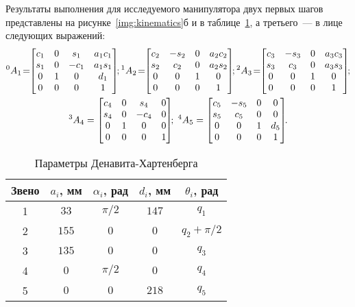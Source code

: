 Результаты выполнения для исследуемого манипулятора двух первых шагов представлены на рисунке~\ref{img:kinematics}б и в таблице~\ref{table_DH_params}, а третьего~--- в лице следующих выражений:
\begin{gather}
	{}^0A_1\! =\!\!
    \left[\begin{matrix}c_1 & 0 & s_1 & a_{1} c_1\\s_1 & 0 & - c_1 & a_{1} s_1\\0 & 1 & 0 & d_{1}\\0 & 0 & 0 & 1\end{matrix}\right]\!\!;
	{}^1A_2\! =\!\!
	\left[\begin{matrix}c_2 & - s_2 & 0 & a_{2} c_2\\s_2 & c_2 & 0 & a_{2} s_2\\0 & 0 & 1 & 0\\0 & 0 & 0 & 1\end{matrix}\right]\!\!;
	{}^2A_3\! =\!\!
	\left[\begin{matrix}c_3 & - s_3 & 0 & a_{3} c_3\\s_3 & c_3 & 0 & a_{3} s_3\\0 & 0 & 1 & 0\\0 & 0 & 0 & 1\end{matrix}\right]\!\!;\notag
	\\
	{}^3A_4 =
	 \left[\begin{matrix}c_4 & 0 & s_4 & 0\\s_4 & 0 & - c_4 & 0\\0 & 1 & 0 & 0\\0 & 0 & 0 & 1\end{matrix}\right]\!\!;
	\;
	{}^4A_5 =
	\left[\begin{matrix}c_5 & - s_5 & 0 & 0\\s_5 & c_5 & 0 & 0\\0 & 0 & 1 & d_{5}\\0 & 0 & 0 & 1\end{matrix}\right]\!\!\ldotp
	\label{eq_all_ht_matrices}
\end{gather}

\begin{table}[h!]
	\caption{Параметры Денавита-Хартенберга}
	\begin{center}
		\begin{tabular}{|c|c|c|c|c|}
			\hline
			Звено 	& $a_i$, мм & $\alpha_i$, рад & $d_i$, мм & $\theta_i$, рад\\
			\hline
			1  		& $33$ & $\pi/2$ & $147$ & $q_1$\\
			\hline
			2 		& $155$ & $0$ 	& $0$ 	& $q_2 + \pi/2$\\
			\hline
			3 		& $135$ & $0$ 	& $0$ 	& $q_3$\\
			\hline
			4 		& $0$ & $\pi/2$ & $0$ 	& $q_4$\\
			\hline
			5 		& $0$ & $0$ 	& $218$ & $q_5$\\
			\hline
		\end{tabular}
	\end{center}
	\label{table_DH_params}
\end{table}


